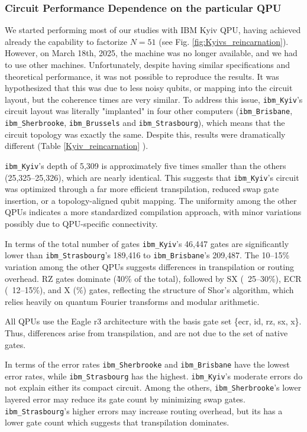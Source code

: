 \documentclass[conference,twoside]{IEEEtran}
\begin{document}
\subsubsection{Circuit Performance Dependence on the particular QPU}

We started performing most of our studies with IBM Kyiv QPU, having achieved already the capability to factorize $N=51$ (see Fig. \ref{fig:Kyivs_reincarnation}). However, on March 18th, 2025, the machine was no longer available, and we had to use other machines. Unfortunately, despite having similar specifications and theoretical performance, it was not possible to reproduce the results. It was hypothesized that this was due to less noisy qubits, or mapping into the circuit layout, but the coherence times are very similar. 
To address this issue, \texttt{ibm\_Kyiv}'s circuit layout was literally "implanted" in four other computers (\texttt{ibm\_Brisbane}, \texttt{ibm\_Sherbrooke}, \texttt{ibm\_Brussels} and \texttt{ibm\_Strasbourg}), which means that the circuit topology was exactly the same. Despite this, results were dramatically different (Table \ref{Kyiv_reincarnation} ). 

\texttt{ibm\_Kyiv}'s depth of 5,309 is approximately five times smaller than the others (25,325--25,326), which are nearly identical. This suggests that \texttt{ibm\_Kyiv}'s circuit was optimized through a far more efficient transpilation, reduced swap gate insertion, or a topology-aligned qubit mapping. The uniformity among the other QPUs indicates a more standardized compilation approach, with minor variations possibly due to QPU-specific connectivity.

In terms of the total number of gates \texttt{ibm\_Kyiv}'s 46,447 gates are significantly lower than \texttt{ibm\_Strasbourg}'s 189,416 to \texttt{ibm\_Brisbane}'s 209,487. The 10--15\% variation among the other QPUs suggests differences in transpilation or routing overhead. RZ gates dominate (\~40\% of the total), followed by SX (~25--30\%), ECR (~12--15\%), and X (\%) gates, reflecting the structure of Shor's algorithm, which relies heavily on quantum Fourier transforms and modular arithmetic.

All QPUs use the Eagle r3 architecture with the basis gate set \{ecr, id, rz, sx, x\}. Thus, differences arise from transpilation, and are not due to the  set of native gates.

In terms of the error rates \texttt{ibm\_Sherbrooke} and \texttt{ibm\_Brisbane} have the lowest error rates, while \texttt{ibm\_Strasbourg} has the highest. \texttt{ibm\_Kyiv}'s moderate errors do not explain either its compact circuit. Among the others, \texttt{ibm\_Sherbrooke}'s lower layered error may reduce its gate count by minimizing swap gates. \texttt{ibm\_Strasbourg}'s higher errors may increase routing overhead, but its has a lower gate count which suggests that transpilation dominates.
\end{document}
